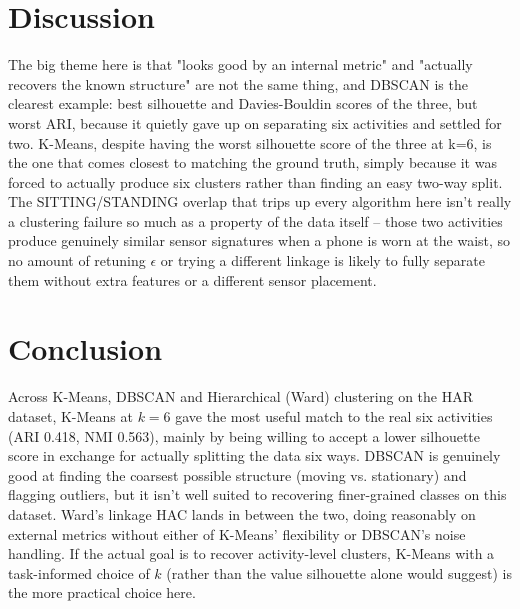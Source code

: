 \documentclass[12pt,a4paper]{article}
\begin{document}
\section{Discussion}
The big theme here is that "looks good by an internal metric" and "actually recovers the known
structure" are not the same thing, and DBSCAN is the clearest example: best silhouette and
Davies-Bouldin scores of the three, but worst ARI, because it quietly gave up on separating six
activities and settled for two. K-Means, despite having the worst silhouette score of the three at
k=6, is the one that comes closest to matching the ground truth, simply because it was forced to
actually produce six clusters rather than finding an easy two-way split. The SITTING/STANDING overlap
that trips up every algorithm here isn't really a clustering failure so much as a property of the data
itself -- those two activities produce genuinely similar sensor signatures when a phone is worn at the
waist, so no amount of retuning $\epsilon$ or trying a different linkage is likely to fully separate
them without extra features or a different sensor placement.

\section{Conclusion}
Across K-Means, DBSCAN and Hierarchical (Ward) clustering on the HAR dataset, K-Means at $k=6$ gave the
most useful match to the real six activities (ARI 0.418, NMI 0.563), mainly by being willing to accept
a lower silhouette score in exchange for actually splitting the data six ways. DBSCAN is genuinely good
at finding the coarsest possible structure (moving vs. stationary) and flagging outliers, but it isn't
well suited to recovering finer-grained classes on this dataset. Ward's linkage HAC lands in between
the two, doing reasonably on external metrics without either of K-Means' flexibility or DBSCAN's noise
handling. If the actual goal is to recover activity-level clusters, K-Means with a task-informed choice
of $k$ (rather than the value silhouette alone would suggest) is the more practical choice here.
\end{document}
